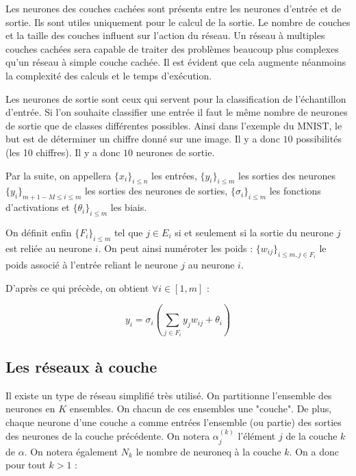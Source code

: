 \medskip

Les neurones des couches cachées sont présents entre les neurones d'entrée et de
sortie. Ils sont utiles uniquement pour le calcul de la sortie. Le nombre de
couches et la taille des couches influent sur l'action du réseau. Un réseau à
multiples couches cachées sera capable de traiter des problèmes beaucoup plus
complexes qu'un réseau à simple couche cachée. Il est évident que cela augmente
néanmoins la complexité des calculs et le temps d'exécution.

\medskip

Les neurones de sortie sont ceux qui servent pour la classification de
l'échantillon d'entrée. Si l'on souhaite classifier une entrée il faut le même
nombre de neurones de sortie que de classes différentes possibles. Ainsi dans
l'exemple du MNIST, le but est de déterminer un chiffre donné sur une image.
Il y a donc $10$ possibilités (les 10 chiffres). Il y a donc $10$ neurones de
sortie.

\medskip

Par la suite, on appellera $\{x_i\}_{i \leq n}$ les entrées, $\{y_i\}_{i \leq m}$
 les sorties des neurones $\{y_i\}_{m+1-M \leq i \leq m}$ les sorties des
neurones de sorties, $\{\sigma_i\}_{i \leq m}$ les fonctions d'activations et
$\{\theta_i\}_{i \leq m}$ les biais.

\medskip

On définit enfin $\{F_i\}_{i \leq m}$ tel que $j \in E_i$ si et seulement si la
sortie du neurone $j$ est reliée au neurone $i$. On peut ainsi numéroter les
poids : $\{w_{ij}\}_{i \leq m, j \in F_i} $ le poids associé à l'entrée reliant
le neurone $j$ au neurone $i$.

\medskip

D'après ce qui précède, on obtient $\forall i \in [1, m]$ :

\[y_i = \sigma_i(\sum_{j \in F_i} y_jw_{ij} + \theta_i) \]

\subsection{Les réseaux à couche}

Il existe un type de réseau simplifié très utilisé. On partitionne l'ensemble
des neurones en $K$ ensembles. On chacun de ces ensembles une "couche". De plus,
chaque neurone d'une couche a comme entrées l'ensemble (ou partie) des sorties
des neurones de la couche précédente. On notera $\alpha^{(k)}_j$ l'élément $j$
de la couche $k$ de $\alpha$. On notera également $N_k$ le nombre de neuroneq à
la couche $k$. On a donc pour tout $k > 1$ :

